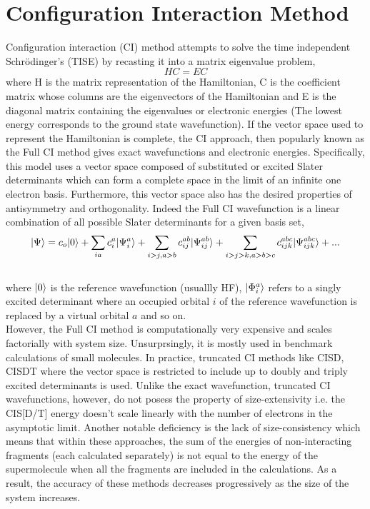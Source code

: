 \section{Configuration Interaction Method}
Configuration interaction (CI) method\cite{Sherrill98:CI} attempts to solve the time independent 
Schr\"odinger's (TISE) by recasting it into a matrix eigenvalue problem, 
\begin{equation}
HC = EC
\end{equation}
where H is the matrix representation of the Hamiltonian, C is the coefficient matrix
whose columns are the eigenvectors of the Hamiltonian and E is the diagonal matrix 
containing the eigenvalues or electronic energies (The lowest energy corresponds to 
the ground state wavefunction). If the vector space used to represent the Hamiltonian 
is complete, the CI approach, then popularly known as the Full CI method gives exact 
wavefunctions and electronic energies. Specifically, this model uses a vector space 
composed of substituted or excited Slater determinants which can form a complete
space in the limit of an infinite one electron basis. Furthermore, this vector space 
also has the desired properties of antisymmetry and orthogonality. Indeed the Full 
CI wavefunction is a linear combination of all possible Slater determinants for a given basis set,
\\
\begin{equation}
| \Psi \rangle = c_o| 0 \rangle + \sum_{ia}{c}_{i}^{a}| {\Psi}^a_i \rangle + \sum_{i>j,a>b}c_{ij}^{ab}| \Psi^{ab}_{ij} \rangle + \sum_{i>j>k,a>b>c}c_{ijk}^{abc}| \Psi^{abc}_{ijk} \rangle + ...
\end{equation}
\\
where $| 0 \rangle$ is the reference wavefunction (usuallly HF), $| {\Phi}^a_i \rangle$ refers to a singly excited determinant where an occupied orbital $i$ of the reference wavefunction is replaced by a virtual orbital $a$
and so on.\\
However, the Full CI method is computationally very expensive and scales factorially with 
system size. Unsurprsingly, it is mostly used in benchmark calculations of small molecules.
In practice, truncated CI methods like CISD, CISDT where the vector 
space is restricted to include up to doubly and triply excited determinants 
is used. Unlike the exact wavefunction, truncated CI wavefunctions, however, 
do not posess the property of size-extensivity i.e. the CIS[D/T] energy doesn't scale 
linearly with the number of electrons in the asymptotic limit. Another notable deficiency 
is the lack of size-consistency which means that within these approaches, the sum of the 
energies of non-interacting fragments (each calculated separately) is not equal to the energy 
of the supermolecule when all the fragments are included in the calculations.
As a result, the accuracy of these methods decreases progressively as the size of the system increases.
